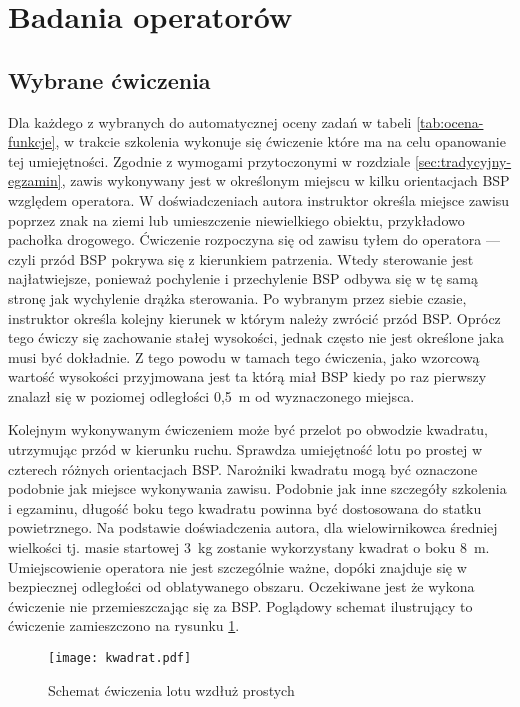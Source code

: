 \newpage
\section{Badania operatorów}

\subsection{Wybrane ćwiczenia}
Dla każdego z wybranych do automatycznej oceny zadań w tabeli \ref{tab:ocena-funkcje}, w trakcie szkolenia wykonuje się ćwiczenie które ma na celu opanowanie tej umiejętności. Zgodnie z wymogami przytoczonymi w rozdziale \ref{sec:tradycyjny-egzamin}, zawis wykonywany jest w określonym miejscu w kilku orientacjach BSP względem operatora. W doświadczeniach autora instruktor określa miejsce zawisu poprzez znak na ziemi lub umieszczenie niewielkiego obiektu, przykładowo pachołka drogowego. Ćwiczenie rozpoczyna się od zawisu tyłem do operatora --- czyli przód BSP pokrywa się z kierunkiem patrzenia. Wtedy sterowanie jest najłatwiejsze, ponieważ pochylenie i przechylenie BSP odbywa się w tę samą stronę jak wychylenie drążka sterowania. Po wybranym przez siebie czasie, instruktor określa kolejny kierunek w którym należy zwrócić przód BSP. Oprócz tego ćwiczy się zachowanie stałej wysokości, jednak często nie jest określone jaka musi być dokładnie. Z tego powodu w tamach tego ćwiczenia, jako wzorcową wartość wysokości przyjmowana jest ta którą miał BSP kiedy po raz pierwszy znalazł się w poziomej odległości 0,5~m od wyznaczonego miejsca.

Kolejnym wykonywanym ćwiczeniem może być przelot po obwodzie kwadratu, utrzymując przód w kierunku ruchu. Sprawdza umiejętność lotu po prostej w czterech różnych orientacjach BSP. Narożniki kwadratu mogą być oznaczone podobnie jak miejsce wykonywania zawisu. Podobnie jak inne szczegóły szkolenia i egzaminu, długość boku tego kwadratu powinna być dostosowana do statku powietrznego. Na podstawie doświadczenia autora, dla wielowirnikowca średniej wielkości tj. masie startowej 3~kg zostanie wykorzystany kwadrat o boku 8~m. Umiejscowienie operatora nie jest szczególnie ważne, dopóki znajduje się w bezpiecznej odległości od oblatywanego obszaru. Oczekiwane jest że wykona ćwiczenie nie przemieszczając się za BSP. Poglądowy schemat ilustrujący to ćwiczenie zamieszczono na rysunku \ref{fig:kwadrat}.

\begin{figure}[!h]
    \centering \texttt{[image: kwadrat.pdf]}
    \caption{Schemat ćwiczenia lotu wzdłuż prostych}
    \label{fig:kwadrat}
\end{figure}

